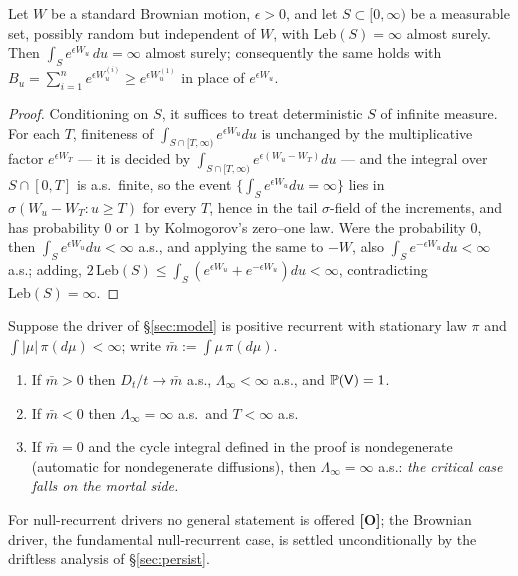 \begin{lemma}
\label{lem:infbackground}
Let $W$ be a standard Brownian motion, $\epsilon>0$, and let
$S\subset[0,\infty)$ be a measurable set, possibly random but
independent of $W$, with $\mathrm{Leb}(S)=\infty$ almost surely. Then
$\int_S e^{\epsilon W_u}\,du=\infty$ almost surely; consequently the
same holds with $B_u=\sum_{i=1}^ne^{\epsilon W^{(i)}_u}\ge
e^{\epsilon W^{(1)}_u}$ in place of $e^{\epsilon W_u}$.
\end{lemma}

\begin{proof}
Conditioning on $S$, it suffices to treat deterministic $S$ of
infinite measure. For each $T$, finiteness of
$\int_{S\cap[T,\infty)}e^{\epsilon W_u}du$ is unchanged by the
multiplicative factor $e^{\epsilon W_T}$ --- it is decided by
$\int_{S\cap[T,\infty)}e^{\epsilon(W_u-W_T)}du$ --- and the integral
over $S\cap[0,T]$ is a.s.\ finite, so the event
$\{\int_Se^{\epsilon W_u}du=\infty\}$ lies in
$\sigma(W_u-W_T:u\ge T)$ for every $T$, hence in the tail
$\sigma$-field of the increments, and has probability $0$ or $1$ by
Kolmogorov's zero--one law. Were the probability $0$, then
$\int_Se^{\epsilon W_u}du<\infty$ a.s., and applying the same to $-W$,
also $\int_Se^{-\epsilon W_u}du<\infty$ a.s.; adding,
$2\,\mathrm{Leb}(S)\le\int_S(e^{\epsilon W_u}+e^{-\epsilon W_u})du
<\infty$, contradicting $\mathrm{Leb}(S)=\infty$.
\end{proof}

\begin{proposition}\label{prop:recurrent}
Suppose the driver of \S\ref{sec:model} is positive recurrent with
stationary law $\pi$ and $\int|\mu|\,\pi(d\mu)<\infty$; write
$\bar m:=\int\mu\,\pi(d\mu)$.
\begin{enumerate}[label=\emph{(\alph*)},itemsep=1pt]
\item If $\bar m>0$ then $D_t/t\to\bar m$ a.s., $\Lambda_\infty<\infty$
a.s., and $\mathbb{P}(\mathsf{V})=1$.
\item If $\bar m<0$ then $\Lambda_\infty=\infty$ a.s.\ and $T<\infty$ a.s.
\item If $\bar m=0$ and the cycle integral defined in the proof is
nondegenerate (automatic for nondegenerate diffusions), then
$\Lambda_\infty=\infty$ a.s.: \emph{the critical case falls on the mortal
side.}
\end{enumerate}
For null-recurrent drivers no general statement is offered
\textbf{[O]}; the Brownian driver, the fundamental null-recurrent case, is
settled unconditionally by the driftless analysis of \S\ref{sec:persist}.
\end{proposition}

